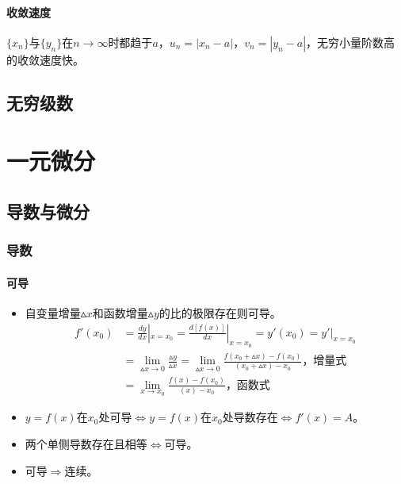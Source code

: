 \documentclass[
12pt, %
a4paper, 
oneside, %
headinclude,footinclude, %
]{scrartcl}
\begin{document}
\paragraph{收敛速度}
$ \{x_n\} $与$ \{y_n\} $在$ n \to \infty $时都趋于$ a $，$ u_n = |x_n - a| $，$ v_n = |y_n - a| $，无穷小量阶数高的收敛速度快。
\subsection[无穷级数]{无穷级数}
\section{一元微分}
\subsection[导数与微分]{导数与微分}
\subsubsection[导数]{导数}
\paragraph{可导}
\begin{itemize}
\item 自变量增量$ \vartriangle x $和函数增量$ \vartriangle y $的比的极限存在则可导。
\begin{align*}
f'(x_0) &= \frac{dy}{dx}|_{x = x_0} = \frac{d[f(x)]}{dx}|_{x = x_0} = y'(x_0) = y'|_{x = x_0} \\
&= \lim_{\vartriangle x \to 0}\frac{\vartriangle y}{\vartriangle x} 
= \lim_{\vartriangle x \to 0}\frac{f(x_0 + \vartriangle x) - f(x_0)}{(x_0 + \vartriangle x) - x_0} \text{，增量式} \\
&= \lim_{x \to x_0}\frac{f(x) - f(x_0)}{(x) - x_0} \text{，函数式}
\end{align*}
\item $ y = f(x) $在$ x_0 $处可导$ \Leftrightarrow $$ y = f(x) $在$ x_0 $处导数存在$ \Leftrightarrow $$ f'(x) = A $。
\item 两个单侧导数存在且相等$ \Leftrightarrow $可导。
\item 可导$ \Rightarrow $连续。
\end{itemize}
\end{document}
